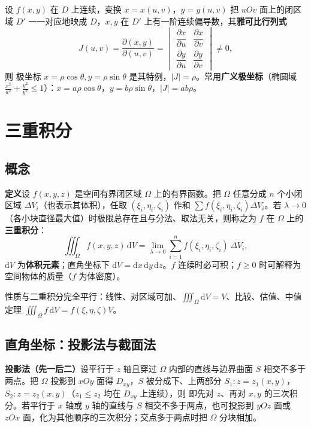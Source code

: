 设 $f(x,y)$ 在 $D$ 上连续，变换 $x=x(u,v)$，$y=y(u,v)$ 把 $uOv$ 面上的闭区域 $D'$ 一一对应地映成 $D$，$x,y$ 在 $D'$ 上有一阶连续偏导数，其\textbf{雅可比行列式}
\[
J(u,v)=\frac{\partial(x,y)}{\partial(u,v)}
=\begin{vmatrix}
\dfrac{\partial x}{\partial u} & \dfrac{\partial x}{\partial v}\\[8pt]
\dfrac{\partial y}{\partial u} & \dfrac{\partial y}{\partial v}
\end{vmatrix}\ne0 ,
\]
则
极坐标 $x=\rho\cos\theta,y=\rho\sin\theta$ 是其特例，$|J|=\rho$。常用\textbf{广义极坐标}（椭圆域 $\frac{x^2}{a^2}+\frac{y^2}{b^2}\le1$）：$x=a\rho\cos\theta$，$y=b\rho\sin\theta$，$|J|=ab\rho$。


\section{三重积分}
\subsection{概念}

\textbf{定义}\quad 设 $f(x,y,z)$ 是空间有界闭区域 $\Omega$ 上的有界函数。把 $\Omega$ 任意分成 $n$ 个小闭区域 $\Delta V_i$（也表示其体积），任取 $(\xi_i,\eta_i,\zeta_i)$ 作和 $\sum f(\xi_i,\eta_i,\zeta_i)\Delta V_i$。若 $\lambda\to0$（各小块直径最大值）时极限总存在且与分法、取法无关，则称之为 $f$ 在 $\Omega$ 上的\textbf{三重积分}：
\[
\iiint_\Omega f(x,y,z)\,\mathrm{d}V=\lim_{\lambda\to0}\sum_{i=1}^{n}f(\xi_i,\eta_i,\zeta_i)\,\Delta V_i ,
\]
$\mathrm{d}V$ 为\textbf{体积元素}；直角坐标下 $\mathrm{d}V=\mathrm{d}x\,\mathrm{d}y\,\mathrm{d}z$。$f$ 连续时必可积；$f\ge0$ 时可解释为空间物体的质量（$f$ 为体密度）。

性质与二重积分完全平行：线性、对区域可加、$\iiint_\Omega\mathrm{d}V=V$、比较、估值、中值定理 $\iiint_\Omega f\,\mathrm{d}V=f(\xi,\eta,\zeta)V$。

\subsection{直角坐标：投影法与截面法}

\textbf{投影法（先一后二）}\quad 设平行于 $z$ 轴且穿过 $\Omega$ 内部的直线与边界曲面 $S$ 相交不多于两点。把 $\Omega$ 投影到 $xOy$ 面得 $D_{xy}$，$S$ 被分成下、上两部分 $S_1:z=z_1(x,y)$，$S_2:z=z_2(x,y)$（$z_1\le z_2$ 均在 $D_{xy}$ 上连续），则
即先对 $z$、再对 $x,y$ 的三次积分。若平行于 $x$ 轴或 $y$ 轴的直线与 $S$ 相交不多于两点，也可投影到 $yOz$ 面或 $zOx$ 面，化为其他顺序的三次积分；交点多于两点时把 $\Omega$ 分块相加。

